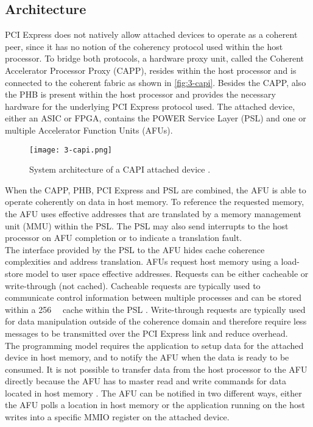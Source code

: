 \subsection{Architecture}
PCI Express does not natively allow attached devices to operate as a coherent peer, since it has no notion of the coherency protocol used within the host processor. To bridge both protocols, a hardware proxy unit, called the Coherent Accelerator Processor Proxy (CAPP), resides within the host processor and is connected to the coherent fabric as shown in \autoref{fig:3-capi}. Besides the CAPP, also the PHB is present within the host processor and provides the necessary hardware for the underlying PCI Express protocol used.
The attached device, either an ASIC or FPGA, contains the POWER Service Layer (PSL) and one or multiple Accelerator Function Units (AFUs).

\begin{figure}[H]
  \centering
  \texttt{[image: 3-capi.png]}
  \caption{System architecture of a CAPI attached device \cite{capi_ibm}.}
  \label{fig:3-capi}
\end{figure}

When the CAPP, PHB, PCI Express and PSL are combined, the AFU is able to operate coherently on data in host memory. To reference the requested memory, the AFU uses effective addresses that are translated by a memory management unit (MMU) within the PSL. The PSL may also send interrupts to the host processor on AFU completion or to indicate a translation fault.\\
The interface provided by the PSL to the AFU hides cache coherence complexities and address translation. AFUs request host memory using a load-store model to user space effective addresses. Requests can be either cacheable or write-through (not cached). Cacheable requests are typically used to communicate control information between multiple processes and can be stored within a \SI{256}{\kilo\byte} cache within the PSL \cite{capi-white}. Write-through requests are typically used for data manipulation outside of the coherence domain and therefore require less messages to be transmitted over the PCI Express link and reduce overhead.\\
The programming model requires the application to setup data for the attached device in host memory, and to notify the AFU when the data is ready to be consumed. It is not possible to transfer data from the host processor to the AFU directly because the AFU has to master read and write commands for data located in host memory \cite{capi-bw}. The AFU can be notified in two different ways, either the AFU polls a location in host memory or the application running on the host writes into a specific MMIO register on the attached device.




